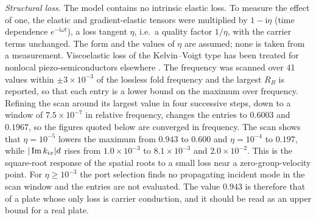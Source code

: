\emph{Structural loss.}  The model contains no intrinsic elastic loss.  To measure the effect of one, the elastic
and gradient-elastic tensors were multiplied by $1-\mathrm i\eta$ (time dependence $e^{-\mathrm i\omega t}$), a loss tangent $\eta$, i.e.\ a
quality factor $1/\eta$, with the carrier terms unchanged.  The form and the values of $\eta$ are assumed; none is taken from a measurement.  Viscoelastic loss of the Kelvin--Voigt type has been treated for nonlocal piezo-semiconductors elsewhere \cite{gupta2026heatmap}.
The frequency was scanned over 41 values within $\pm3\times10^{-3}$ of the lossless fold frequency and the largest $R_B$ is
reported, so that each entry is a lower bound on the maximum over frequency.  Refining the scan around its largest value in four successive steps, down to a window of $7.5\times10^{-7}$ in relative frequency, changes the entries to $0.6003$ and $0.1967$, so the figures quoted below are converged in frequency.  The scan shows that $\eta=10^{-5}$
lowers the maximum from $0.943$ to $0.600$ and $\eta=10^{-4}$ to $0.197$, while
$|\operatorname{Im} k_{ix}|d$ rises from $1.0\times10^{-3}$ to $8.1\times10^{-3}$ and $2.0\times10^{-2}$.  This is the square-root response of the
spatial roots to a small loss near a zero-group-velocity point.  For $\eta\ge10^{-3}$ the port selection finds no
propagating incident mode in the scan window and the entries are not evaluated.  The value
$0.943$ is therefore that of a plate whose only loss is carrier conduction, and it should be read as an upper bound
for a real plate.

